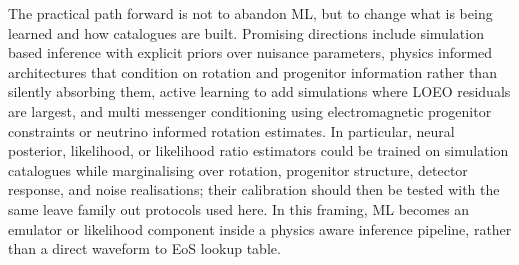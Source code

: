 \documentclass[reprint,aps,prd,floatfix,nofootinbib,superscriptaddress,showpacs]{revtex4-2}
\begin{document}
The practical path forward is not to abandon ML, but to change what is being learned and how catalogues are built. Promising directions include simulation based inference with explicit priors over nuisance parameters, physics informed architectures that condition on rotation and progenitor information rather than silently absorbing them, active learning to add simulations where LOEO residuals are largest, and multi messenger conditioning using electromagnetic progenitor constraints or neutrino informed rotation estimates. In particular, neural posterior, likelihood, or likelihood ratio estimators could be trained on simulation catalogues while marginalising over rotation, progenitor structure, detector response, and noise realisations; their calibration should then be tested with the same leave family out protocols used here. In this framing, ML becomes an emulator or likelihood component inside a physics aware inference pipeline, rather than a direct waveform to EoS lookup table.
\end{document}
